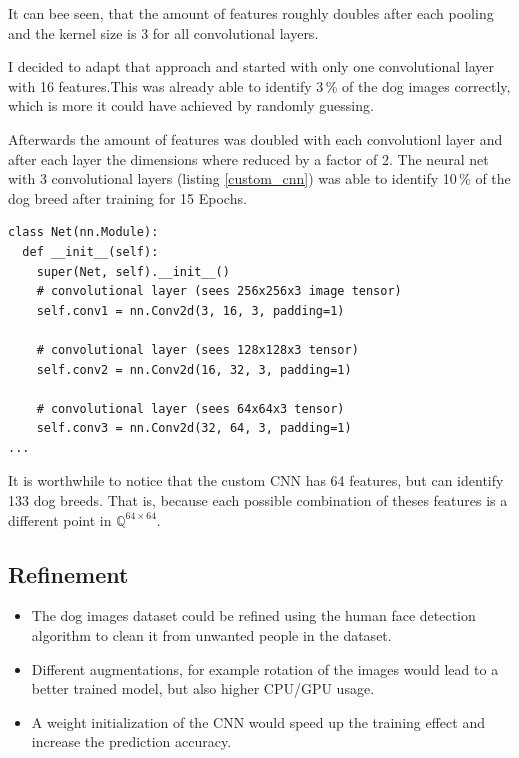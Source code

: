 \documentclass[paper=A4, DIV=10, parskip=half]{scrartcl}
\begin{document}
It can bee seen, that the amount of features roughly doubles after each pooling
and the kernel size is 3 for all convolutional layers.

I decided to adapt that approach and started with only one convolutional layer
with 16 features.This was already able to identify 3\,\% of the dog images
correctly, which is more it could have achieved by randomly guessing. 

Afterwards the amount of features was doubled with each convolutionl layer and
after each layer the dimensions where reduced by a factor of 2. The neural net
with 3 convolutional layers (listing \ref{custom_cnn}) was able to identify
10\,\% of the dog breed after training for 15 Epochs.

\begin{lstlisting}[caption=Custom Design CNN, label=custom_cnn]
class Net(nn.Module):
  def __init__(self):
    super(Net, self).__init__()
    # convolutional layer (sees 256x256x3 image tensor)
    self.conv1 = nn.Conv2d(3, 16, 3, padding=1)

    # convolutional layer (sees 128x128x3 tensor)
    self.conv2 = nn.Conv2d(16, 32, 3, padding=1)

    # convolutional layer (sees 64x64x3 tensor)
    self.conv3 = nn.Conv2d(32, 64, 3, padding=1)
...
\end{lstlisting}

It is worthwhile to notice that the custom CNN has 64 features, but can identify
133 dog breeds. That is, because each possible combination of theses features
is a different point in $\mathbb{Q}^{64\times64}$.


\subsection*{Refinement}

\begin{itemize}
\item The dog images dataset could be refined using the human face detection algorithm
to clean it from unwanted people in the dataset.
\item Different augmentations, for example rotation of the images would lead to
a better trained model, but also higher CPU/GPU usage.
\item A weight initialization of the CNN would speed up the training effect and
increase the prediction accuracy.
\end{itemize}
\end{document}
